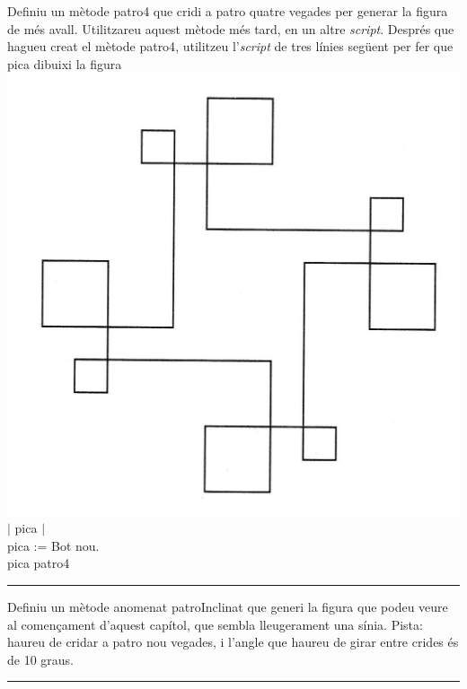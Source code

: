 \begin{center}
\colorbox{black}{}
\end{center}
{\small
\noindent
Definiu un mètode \textsf{patro4} que cridi a \textsf{patro} quatre vegades per generar la figura de més avall. Utilitzareu aquest mètode més tard, en un altre \emph{script}. Després que hagueu creat el mètode \textsf{patro4}, utilitzeu l'\emph{script} de tres línies següent per fer que pica dibuixi la figura}\\
\includegraphics[scale=0.1]{Imatges/figuraE13-1.jpg} 
\noindent
{\small
\textsf{
\\$|$ pica $|$\\
pica := Bot nou.\\
pica patro4\\
}}
\noindent
\rule{\textwidth}{3pt}

\begin{center}
\colorbox{black}{}
\end{center}
{\small
\noindent
Definiu un mètode anomenat \textsf{patroInclinat} que generi la figura que podeu veure al començament d'aquest capítol, que sembla lleugerament una sínia. Pista: haureu de cridar a \textsf{patro} nou vegades, i l'angle que haureu de girar entre crides és de 10 graus.}\\
\noindent
\rule{\textwidth}{3pt}

